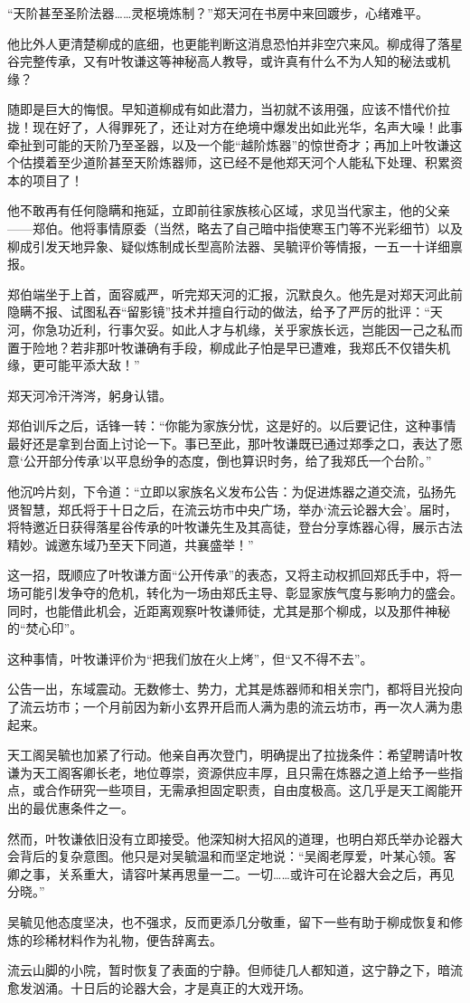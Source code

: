 “天阶甚至圣阶法器……灵枢境炼制？”郑天河在书房中来回踱步，心绪难平。

他比外人更清楚柳成的底细，也更能判断这消息恐怕并非空穴来风。柳成得了落星谷完整传承，又有叶牧谦这等神秘高人教导，或许真有什么不为人知的秘法或机缘？

随即是巨大的悔恨。早知道柳成有如此潜力，当初就不该用强，应该不惜代价拉拢！现在好了，人得罪死了，还让对方在绝境中爆发出如此光华，名声大噪！此事牵扯到可能的天阶乃至圣器，以及一个能“越阶炼器”的惊世奇才；再加上叶牧谦这个估摸着至少道阶甚至天阶炼器师，这已经不是他郑天河个人能私下处理、积累资本的项目了！

他不敢再有任何隐瞒和拖延，立即前往家族核心区域，求见当代家主，他的父亲——郑伯。他将事情原委（当然，略去了自己暗中指使寒玉门等不光彩细节）以及柳成引发天地异象、疑似炼制成长型高阶法器、吴毓评价等情报，一五一十详细禀报。

郑伯端坐于上首，面容威严，听完郑天河的汇报，沉默良久。他先是对郑天河此前隐瞒不报、试图私吞“留影镜”技术并擅自行动的做法，给予了严厉的批评：“天河，你急功近利，行事欠妥。如此人才与机缘，关乎家族长远，岂能因一己之私而置于险地？若非那叶牧谦确有手段，柳成此子怕是早已遭难，我郑氏不仅错失机缘，更可能平添大敌！”

郑天河冷汗涔涔，躬身认错。

郑伯训斥之后，话锋一转：“你能为家族分忧，这是好的。以后要记住，这种事情最好还是拿到台面上讨论一下。事已至此，那叶牧谦既已通过郑季之口，表达了愿意‘公开部分传承’以平息纷争的态度，倒也算识时务，给了我郑氏一个台阶。”

他沉吟片刻，下令道：“立即以家族名义发布公告：为促进炼器之道交流，弘扬先贤智慧，郑氏将于十日之后，在流云坊市中央广场，举办‘流云论器大会’。届时，将特邀近日获得落星谷传承的叶牧谦先生及其高徒，登台分享炼器心得，展示古法精妙。诚邀东域乃至天下同道，共襄盛举！”

这一招，既顺应了叶牧谦方面“公开传承”的表态，又将主动权抓回郑氏手中，将一场可能引发争夺的危机，转化为一场由郑氏主导、彰显家族气度与影响力的盛会。同时，也能借此机会，近距离观察叶牧谦师徒，尤其是那个柳成，以及那件神秘的“焚心印”。

这种事情，叶牧谦评价为“把我们放在火上烤”，但“又不得不去”。

公告一出，东域震动。无数修士、势力，尤其是炼器师和相关宗门，都将目光投向了流云坊市；一个月前因为新小玄界开启而人满为患的流云坊市，再一次人满为患起来。

天工阁吴毓也加紧了行动。他亲自再次登门，明确提出了拉拢条件：希望聘请叶牧谦为天工阁客卿长老，地位尊崇，资源供应丰厚，且只需在炼器之道上给予一些指点，或合作研究一些项目，无需承担固定职责，自由度极高。这几乎是天工阁能开出的最优惠条件之一。

然而，叶牧谦依旧没有立即接受。他深知树大招风的道理，也明白郑氏举办论器大会背后的复杂意图。他只是对吴毓温和而坚定地说：“吴阁老厚爱，叶某心领。客卿之事，关系重大，请容叶某再思量一二。一切……或许可在论器大会之后，再见分晓。”

吴毓见他态度坚决，也不强求，反而更添几分敬重，留下一些有助于柳成恢复和修炼的珍稀材料作为礼物，便告辞离去。

流云山脚的小院，暂时恢复了表面的宁静。但师徒几人都知道，这宁静之下，暗流愈发汹涌。十日后的论器大会，才是真正的大戏开场。